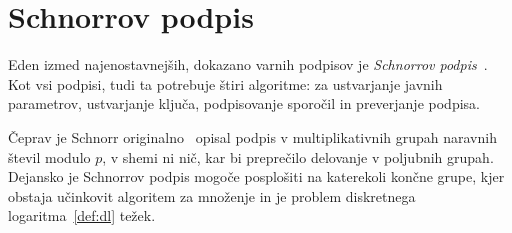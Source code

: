 \section{Schnorrov podpis}
\label{sec:schnorr}
Eden izmed najenostavnejših, dokazano varnih podpisov je \textit{Schnorrov podpis}~\cite{schnorr1989sig}.
Kot vsi podpisi, tudi ta potrebuje štiri algoritme: za ustvarjanje javnih parametrov, ustvarjanje ključa, 
podpisovanje sporočil in preverjanje podpisa.

Čeprav je Schnorr originalno~\cite{schnorr1989sig} opisal podpis v multiplikativnih grupah naravnih
števil modulo $p$, v shemi ni nič, kar bi preprečilo delovanje v poljubnih grupah. Dejansko
je Schnorrov podpis mogoče posplošiti na katerekoli končne grupe, kjer obstaja učinkovit algoritem
za množenje in je problem diskretnega logaritma~\ref{def:dl} težek.
